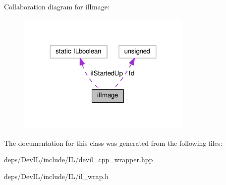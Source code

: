 Collaboration diagram for il\+Image\+:
\nopagebreak
\begin{figure}[H]
\begin{center}
\leavevmode
\includegraphics[width=240pt]{d9/d8b/classilImage__coll__graph}
\end{center}
\end{figure}


The documentation for this class was generated from the following files\+:\begin{DoxyCompactItemize}
\item 
deps/\+Dev\+I\+L/include/\+I\+L/devil\+\_\+cpp\+\_\+wrapper.\+hpp\item 
deps/\+Dev\+I\+L/include/\+I\+L/il\+\_\+wrap.\+h\end{DoxyCompactItemize}
